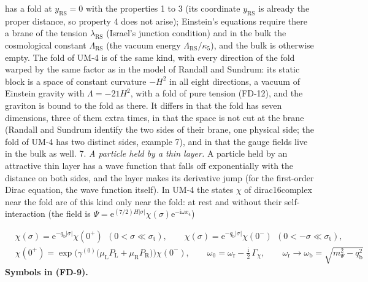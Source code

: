 \documentclass[
  10pt,
]{article}
\begin{document}
has a fold at \(y_{\mathrm{RS}} = 0\) with the properties 1 to 3 (its
coordinate \(y_{\mathrm{RS}}\) is already the proper distance, so
property 4 does not arise); Einstein's equations require there a brane
of the tension \(\lambda_{\mathrm{RS}}\) (Israel's junction condition)
and in the bulk the cosmological constant \(\Lambda_{\mathrm{RS}}\) (the
vacuum energy \(\Lambda_{\mathrm{RS}}/\kappa_5\)), and the bulk is
otherwise empty. The fold of UM-4 is of the same kind, with every
direction of the fold warped by the same factor as in the model of
Randall and Sundrum: its static block is a space of constant curvature
\(-H^2\) in all eight directions, a vacuum of Einstein gravity with
\(\Lambda = -21H^2\), with a fold of pure tension (FD-12), and the
graviton is bound to the fold as there. It differs in that the fold has
seven dimensions, three of them extra times, in that the space is not
cut at the brane (Randall and Sundrum identify the two sides of their
brane, one physical side; the fold of UM-4 has two distinct sides,
example 7), and in that the gauge fields live in the bulk as well. 7.
\emph{A particle held by a thin layer.} A particle held by an attractive
thin layer has a wave function that falls off exponentially with the
distance on both sides, and the layer makes its derivative jump (for the
first-order Dirac equation, the wave function itself). In UM-4 the
states \(\chi\) of dirac16complex near the fold are of this kind only
near the fold: at rest and without their self-interaction (the field is
\(\Psi = \mathrm{e}^{(7/2)H\lvert\sigma\rvert}\chi(\sigma)\mathrm{e}^{-\mathrm{i}\omega x_4}\))

\[
\begin{aligned}
&\chi(\sigma) = \mathrm{e}^{-q_{\mathrm{b}}\lvert\sigma\rvert}\chi(0^+)\ \ (0 < \sigma \ll \sigma_{\mathrm{t}}),\qquad
\chi(\sigma) = \mathrm{e}^{-q_{\mathrm{b}}\lvert\sigma\rvert}\chi(0^-)\ \ (0 < -\sigma \ll \sigma_{\mathrm{t}}),\\
&\chi(0^+) = \exp\Big(\gamma^{(0)}\big(\mu_{\mathrm{L}}P_{\mathrm{L}} + \mu_{\mathrm{R}}P_{\mathrm{R}}\big)\Big)\chi(0^-),\qquad
\omega_0 = \omega_{\mathrm{r}} - \frac{\mathrm{i}}{2}\,\Gamma_\chi,\qquad \omega_{\mathrm{r}} \to \omega_{\mathrm{b}} = \sqrt{m_\Psi^2 - q_{\mathrm{b}}^2}
\end{aligned} \tag{FD-9}
\] \textbf{Symbols in (FD-9).}
\end{document}
